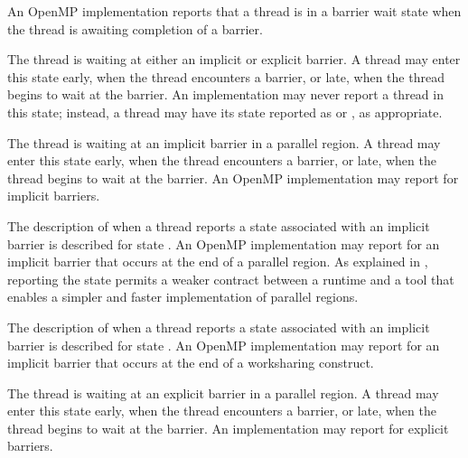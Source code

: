 
An OpenMP implementation reports that a thread is in a barrier wait state
when the thread is awaiting completion of a barrier.


\begin{description}

  \item {}

  \sloppy
  The thread is waiting at either an implicit or explicit barrier.
  A thread may enter this state
  early, when the thread encounters a barrier, or late, when the
  thread begins to wait at the barrier. An implementation may never report a thread in this state; instead, a thread may have its state reported
  as   or , as appropriate.

  \item {}

  \sloppy
  The thread is waiting at an implicit barrier in a parallel region.
  A  thread may enter this state
  early, when the thread encounters a barrier, or late, when the
  thread begins to wait at the barrier.
  An OpenMP implementation may report 
  for implicit barriers.

  \item {}

  The description of when a thread reports a state associated with an implicit barrier
  is described for state .
  An OpenMP implementation may report 
  for an implicit barrier that occurs at the end of a parallel region.
  As explained in ,
  reporting the state 
  permits a weaker contract between a runtime and a tool that
  enables a simpler and faster implementation of parallel regions.

  \item {}

  The description of when a thread reports a state associated with an implicit barrier
  is described for state .
  An OpenMP implementation may report 
  for an implicit barrier that occurs at the end of a worksharing construct.

  \item {}

  The thread is waiting at an explicit barrier  in a parallel region.
  A thread may enter this state
  early, when the thread encounters a barrier, or late, when the
  thread begins to wait at the barrier.
  An implementation may report 
  for explicit barriers.


\end{description}

